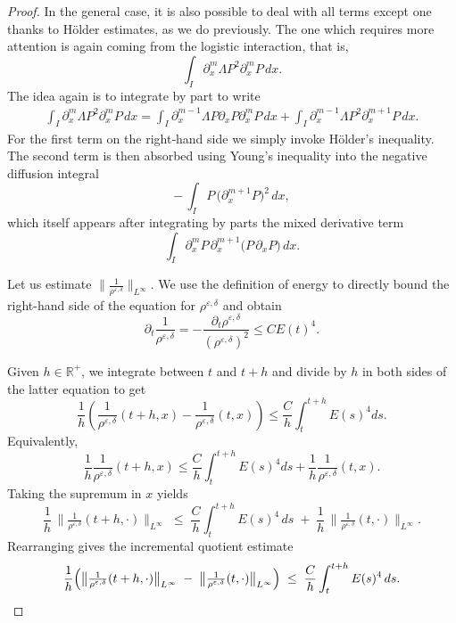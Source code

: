 \documentclass[12pt]{amsart}
\newcommand{\rhoed}{\rho^{\varepsilon,\delta}}
\newcommand{\D}{\,d}
\begin{document}
\begin{proof}
        In the general case, it is also possible to deal with all terms except one  thanks to Hölder estimates, as we do previously. The one which requires  more attention is again  coming from the logistic interaction, that is,
        \begin{equation*}
            \int_I\partial_x^m\Lambda P^2\partial_x^mP \D x.
        \end{equation*}
        The idea again is to integrate by part to write
        \begin{equation*}
            \begin{split}
            \int _I\partial_x^m\Lambda P^2\partial_x^mP \D x =\int_I \partial_x^{m-1}\Lambda P\partial_x P\partial_x^mP \D x +\int_I \partial_x^{m-1}\Lambda P^2\partial_x^{m+1}P \D x.
            \end{split}
        \end{equation*}
        For the first term on the right‐hand side we simply invoke Hölder’s inequality.  The second term is then absorbed using Young’s inequality into the negative diffusion integral
$$
-\,\int_I P\,\bigl(\partial_x^{m+1}P\bigr)^2\,dx,
$$
which itself appears after integrating by parts the mixed derivative term
$$
\int_I \partial_x^{m}P\,\partial_x^{m+1}\bigl(P\,\partial_x P\bigr)\,dx.
$$

            Let us estimate $\|\frac{1}{\rho^{\varepsilon,\delta}}\|_{L^\infty}$. We use the definition of energy to directly bound the right-hand side of the equation for $\rho^{\varepsilon,\delta}$  and obtain
        \begin{equation*}
            \partial_t \frac{1}{\rhoed}=-\frac{\partial_t \rhoed}{(\rhoed)^2} \leq CE(t)^4 .
        \end{equation*}
    

                Given $h\in \mathbb{R}^+$, we integrate between $t$ and $t+h$ and divide by $h$ in both sides of the latter equation to get
        \begin{equation*}
            \frac{1}{h}\left( \frac{1}{\rho^{\varepsilon,\delta}}(t+h,x)-\frac{1}{\rho^{\varepsilon,\delta}}(t,x)\right) \leq \frac{C}{h}\int_{t}^{t+h}E(s)^4 ds.
        \end{equation*}
        Equivalently,
        \begin{equation*}
            \frac{1}{h} \frac{1}{\rho^{\varepsilon,\delta}}(t+h,x) \leq \frac{C}{h}\int_{t}^{t+h}E(s)^4 ds+\frac{1}{h}\frac{1}{\rho^{\varepsilon,\delta}}(t,x).
        \end{equation*}
        Taking the supremum in $x$ yields
$$
\frac{1}{h}\,\biggl\|\tfrac{1}{\rho^{\varepsilon,\delta}}(t+h,\cdot)\biggr\|_{L^\infty}
\;\le\;
\frac{C}{h}\int_{t}^{t+h}E(s)^{4}\,ds
\;+\;
\frac{1}{h}\,\biggl\|\tfrac{1}{\rho^{\varepsilon,\delta}}(t,\cdot)\biggr\|_{L^\infty}.
$$
Rearranging gives the incremental quotient estimate
$$
\frac{1}{h}\Bigl(
\bigl\|\tfrac{1}{\rho^{\varepsilon,\delta}}(t+h,\cdot)\bigr\|_{L^\infty}
\;-\;
\bigl\|\tfrac{1}{\rho^{\varepsilon,\delta}}(t,\cdot)\bigr\|_{L^\infty}
\Bigr)
\;\le\;
\frac{C}{h}\int_{t}^{t+h}E(s)^{4}\,ds.
$$



\end{proof}
\end{document}

